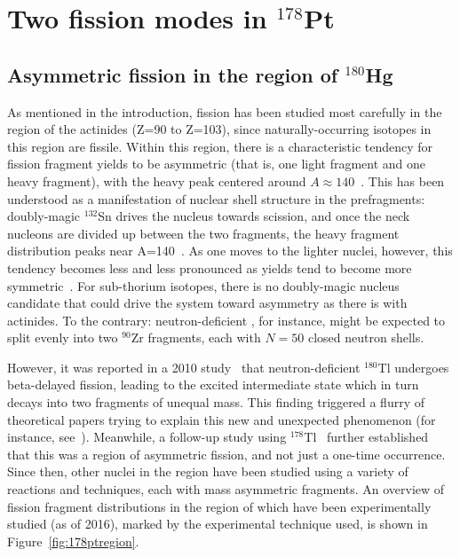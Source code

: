 \chapter{Two fission modes in $^{178}$Pt}\label{chap:178Pt}

\section{Asymmetric fission in the region of $^{180}$Hg}
As mentioned in the introduction, fission has been studied most carefully in the region of the actinides (Z=90 to Z=103), since naturally-occurring isotopes in this region are fissile. Within this region, there is a characteristic tendency for fission fragment yields to be asymmetric (that is, one light fragment and one heavy fragment), with the heavy peak centered around $A\approx140$~\cite{unik1974}. This has been understood as a manifestation of nuclear shell structure in the prefragments: doubly-magic $^{132}$Sn drives the nucleus towards scission, and once the neck nucleons are divided up between the two fragments, the heavy fragment distribution peaks near A=140~\cite{Wilkins1976}. As one moves to the lighter nuclei, however, this tendency becomes less and less pronounced as yields tend to become more symmetric~\cite{Schmidt2000,Schmidt2001}. For sub-thorium isotopes, there is no doubly-magic nucleus candidate that could drive the system toward asymmetry as there is with actinides. To the contrary: neutron-deficient {\Hg}, for instance, might be expected to split evenly into two $^{90}$Zr fragments, each with $N=50$ closed neutron shells.

However, it was reported in a 2010 study~\cite{Andreyev2010} that neutron-deficient $^{180}$Tl undergoes beta-delayed fission, leading to the excited intermediate state {\Hg} which in turn decays into two fragments of unequal mass. This finding triggered a flurry of theoretical papers trying to explain this new and unexpected phenomenon (for instance, see~\cite{Warda2012,Moller2012,Mcdonnell2014,Ichikawa2019}). Meanwhile, a follow-up study using $^{178}$Tl~\cite{Liberati2013} further established that this was a region of asymmetric fission, and not just a one-time occurrence. Since then, other nuclei in the region have been studied using a variety of reactions and techniques, each with mass asymmetric fragments. An overview of fission fragment distributions in the region of {\Hg} which have been experimentally studied (as of 2016), marked by the experimental technique used, is shown in Figure~\ref{fig:178ptregion}.

